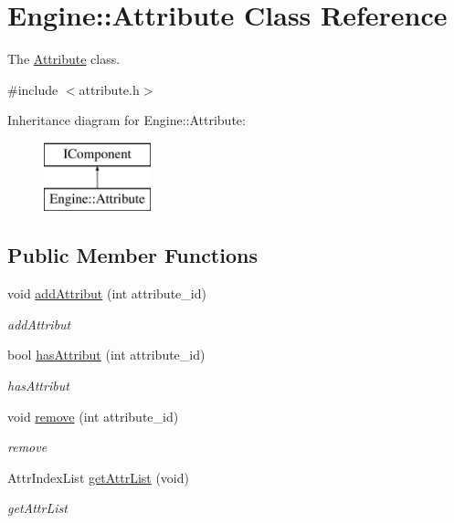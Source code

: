\hypertarget{classEngine_1_1Attribute}{}\section{Engine\+:\+:Attribute Class Reference}
\label{classEngine_1_1Attribute}


The \hyperlink{classEngine_1_1Attribute}{Attribute} class.  




{\ttfamily \#include $<$attribute.\+h$>$}

Inheritance diagram for Engine\+:\+:Attribute\+:\begin{figure}[H]
\begin{center}
\leavevmode
\includegraphics[height=2.000000cm]{classEngine_1_1Attribute}
\end{center}
\end{figure}
\subsection*{Public Member Functions}
\begin{DoxyCompactItemize}
\item 
void \hyperlink{classEngine_1_1Attribute_ac5f7a56bfd8659660a01d57c77b09854}{add\+Attribut} (int attribute\+\_\+id)
\begin{DoxyCompactList}\small\item\em add\+Attribut \end{DoxyCompactList}\item 
bool \hyperlink{classEngine_1_1Attribute_a631efe6abc46594846c900fee4f4a645}{has\+Attribut} (int attribute\+\_\+id)
\begin{DoxyCompactList}\small\item\em has\+Attribut \end{DoxyCompactList}\item 
void \hyperlink{classEngine_1_1Attribute_a412e67db78340d50a1ce0107c36c467c}{remove} (int attribute\+\_\+id)
\begin{DoxyCompactList}\small\item\em remove \end{DoxyCompactList}\item 
Attr\+Index\+List \hyperlink{classEngine_1_1Attribute_a6e884961a7a4798b21dafd6d991b3506}{get\+Attr\+List} (void)
\begin{DoxyCompactList}\small\item\em get\+Attr\+List \end{DoxyCompactList}\end{DoxyCompactItemize}


